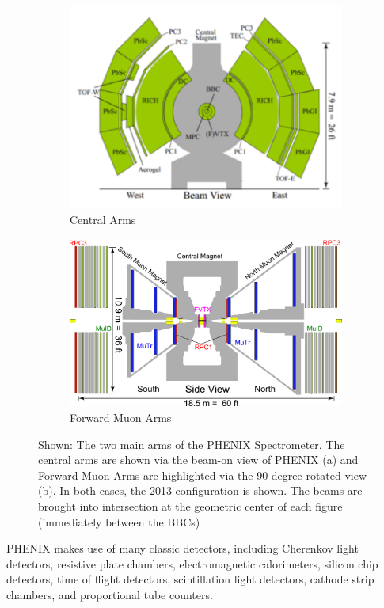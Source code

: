 \begin{figure}
  \centering
  \begin{subfigure}[t]{\textwidth}
    \centering
    \includegraphics[width=0.8\linewidth]{./figures/phenix_2013_config_central_arms}
    \caption{Central Arms}
    \label{fig:phenix_central} 
  \end{subfigure} 
  \begin{subfigure}[t]{\textwidth}
    \centering
    \includegraphics[width=0.8\linewidth]{./figures/phenix_2013_config_muon_arms}
    \caption{Forward Muon Arms}
    \label{fig:phenix_forward}
  \end{subfigure}
  \caption{
    Shown: The two main arms of the PHENIX Spectrometer. The central arms are
    shown via the beam-on view of PHENIX (a) and Forward Muon Arms are highlighted
    via the 90-degree rotated view (b). In both cases, the 2013 configuration is
    shown. The beams are brought into intersection at the geometric center of
    each figure (immediately between the BBCs)
  }
  \label{fig:phenix_2013_config}
\end{figure}

PHENIX makes use of many classic detectors, including  Cherenkov light
detectors, resistive plate chambers, electromagnetic calorimeters, silicon chip
detectors, time of flight detectors, scintillation light detectors, cathode
strip chambers, and proportional tube counters.


